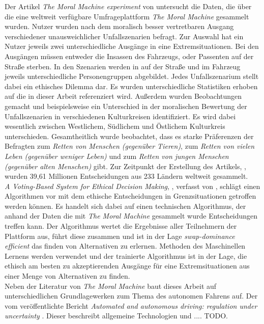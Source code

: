 Der Artikel \textit{The Moral Machine experiment} \cite{moralMachine} von \citeauthor{moralMachine} untersucht die Daten, die über die eine weltweit verfügbare Umfrageplattform \textit{The Moral Machine} gesammelt wurden. Nutzer wurden nach dem moralisch besser vertretbaren Ausgang verschiedener unausweichlicher Unfallszenarien befragt. Zur Auswahl hat ein Nutzer jeweils zwei unterschiedliche Ausgänge in eine Extremsituationen. Bei den Ausgängen müssen entweder die Insassen des Fahrzeugs, oder Passenten auf der Straße sterben. In den Szenarien werden in auf der Straße und im Fahrzeug jeweils unterschiedliche Personengruppen abgebildet. Jedes Unfallszenarium stellt dabei ein ethisches Dilemma dar. Es wurden unterschiedliche Statistiken erhoben auf die in dieser Arbeit referenziert wird. Außerdem wurden Beobachtungen gemacht und beispielsweise ein Unterschied in der moralischen Bewertung der Unfallszenarien in verschiedenen Kulturkreisen identifiziert. Es wird dabei wesentlich zwischen Westlichem, Südlichem und Östlichem Kulturkreis unterschieden. Gesamtheitlich wurde beobachtet, dass es starke Präferenzen der Befragten zum \textit{Retten von Menschen (gegenüber Tieren)}, zum \textit{Retten von vielen Leben (gegenüber weniger Leben)} und zum \textit{Retten von jungen Menschen (gegenüber alten Menschen)} gibt. Zur Zeitpunkt der Erstellung des Artikels, \citeyear{moralMachine}, wurden 39,61 Millionen Entscheidungen aus 233 Ländern weltweit gesammelt. \\


\textit{A Voting-Based System for Ethical Decision Making}, \cite{votingBasedSystem}, verfasst von \citeauthor{votingBasedSystem}, schlägt einen Algorithmen vor mit dem ethische Entscheidungen in Grenzsituationen getroffen werden können. Es handelt sich dabei auf einen technischen Algorithmus, der anhand der Daten die mit \textit{The Moral Machine} gesammelt wurde Entscheidungen treffen kann. Der Algorithmus wertet die Ergebnisse aller Teilnehmern der Plattform aus, führt diese zusammen und ist in der Lage  \textit{swap-dominance efficient} das finden von Alternativen zu erlernen. Methoden des Maschinellen Lernens werden verwendet und der trainierte Algorithmus ist in der Lage, die ethisch am besten zu akzeptierenden Ausgänge für eine Extremsituationen aus einer Menge von Alternativen zu finden.\\

Neben der Literatur von \textit{The Moral Machine} baut dieses Arbeit auf unterschiedlichen Grundlagewerken zum Thema des autonomen Fahrens auf. Der vom \citeauthor{smith2015automated} veröffentlichte Bericht \textit{Automated and
autonomous driving: regulation under uncertainty} \cite{smith2015automated}. Dieser beschreibt allgemeine Technologien und .... TODO.